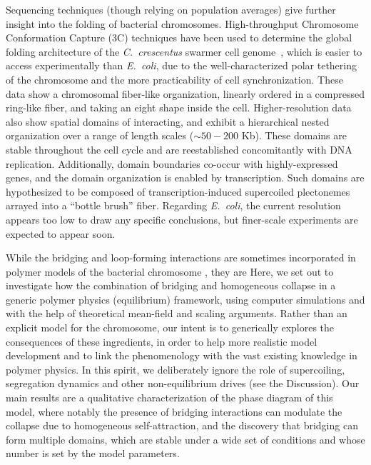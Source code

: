 \documentclass[
preprint,
a4paper,
12pt,
superscriptaddress,
pre]{revtex4}
\begin{document}
Sequencing techniques (though relying on population averages) give
further insight into the folding of bacterial chromosomes.
High-throughput Chromosome Conformation Capture (3C) techniques have
been used to determine the global folding architecture of the
\emph{C.~crescentus} swarmer cell genome~\cite{Le2013,Umbarger2011},
which is easier to access experimentally than \emph{E.~coli}, due to
the well-characterized polar tethering of the chromosome and 
%
the more practicability of cell synchronization.
%
These data show a chromosomal fiber-like organization, linearly
ordered in a compressed ring-like fiber, and taking an eight shape
inside the cell.
%
Higher-resolution data~\cite{Le2013} also show spatial domains of
interacting, and exhibit a hierarchical nested organization over a
range of length scales ($\sim50-200$ Kb). These domains are stable
throughout the cell cycle and are reestablished concomitantly with DNA
replication.  Additionally, domain boundaries co-occur with
highly-expressed genes, and the domain organization is enabled by
transcription. Such domains are hypothesized to be composed of
transcription-induced supercoiled plectonemes arrayed into a ``bottle
brush'' fiber.
Regarding \emph{E.~coli}, the current resolution appears too low
\cite{Cagliero2013} to draw any specific conclusions, but finer-scale
experiments are expected to appear soon.



While the bridging and loop-forming interactions are sometimes
incorporated in polymer models of the bacterial chromosome
\cite{Junier2013,Fritsche2012,Heermann2012}, they are 
Here, we set out to investigate how the combination of bridging and
homogeneous collapse in a generic polymer physics (equilibrium)
framework, using computer simulations and with the help of theoretical
mean-field and scaling arguments.
Rather than an explicit model for the chromosome, our intent is to
generically explores the consequences of these ingredients, in order
to help more realistic model development and to link the phenomenology
with the vast existing knowledge in polymer physics.
In this spirit, we deliberately ignore the role of supercoiling,
segregation dynamics and other non-equilibrium drives (see the
Discussion).
Our main results are a qualitative characterization of the phase
diagram of this model, where notably the presence of bridging
interactions can modulate the collapse due to homogeneous
self-attraction, and the discovery that bridging can form multiple
domains, which are stable under a wide set of conditions and whose
number is set by the model parameters.
\end{document}
